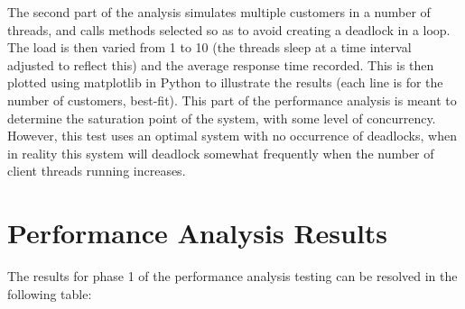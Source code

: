 \documentclass[letterpaper,12pt]{article}
\begin{document}
	The second part of the analysis simulates multiple customers in a number of threads, and calls methods selected so as to avoid creating a deadlock in a loop. The load is then varied from 1 to 10 (the threads sleep at a time interval adjusted to reflect this) and the average response time recorded. This is then plotted using matplotlib in Python to illustrate the results (each line is for the number of customers, best-fit). This part of the performance analysis is meant to determine the saturation point of the system, with some level of concurrency. However, this test uses an optimal system with no occurrence of deadlocks, when in reality this system will deadlock somewhat frequently when the number of client threads running increases. 
	
	\section{ Performance Analysis Results}
	The results for phase 1 of the performance analysis testing can be resolved in the following table:
	
\end{document}
